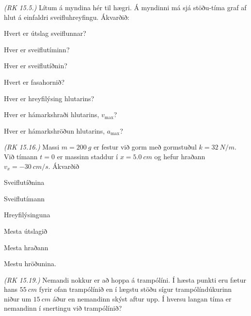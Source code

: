 \ifdefined \wholebook \else\documentclass[oneside]{book}\usepackage{EdlBook}\graphicspath{{figures/}}
\begin{document}
\begin{enumerate}[label = \textbf{Dæmi \thechapter.\arabic*.}]
\begin{minipage}{\linewidth}
\item \textit{(RK 15.5.)} Lítum á myndina hér til hægri. Á myndinni má sjá stöðu-tíma graf af hlut á einfaldri sveifluhreyfingu. Ákvarðið: \begin{enumerate*}[label = \textbf{(\alph*)}]
    \item Hvert er útslag sveiflunnar?
    \item Hver er sveiflutíminn?
    \item Hver er sveiflutíðnin?
    \item Hvert er fasahornið?
    \item Hver er hreyfilýsing hlutarins?
    \item Hver er hámarkshraði hlutarins, $v_{\text{max}}$?
    \item Hver er hámarkshröðun hlutarins, $a_{\text{max}}$?
\end{enumerate*}
\end{minipage}

\vspace{0.1cm}

\item \textit{(RK 15.16.)} Massi $m = \SI{200}{g}$ er festur við gorm með gormstuðul $k = \SI{32}{N/m}$. Við tímann $t = 0$ er massinn staddur í $x = \SI{5.0}{cm}$ og hefur hraðann $v_x = \SI{-30}{cm/s}$. Ákvarðið \begin{enumerate*}[label = \textbf{(\alph*)}]
    \item Sveiflutíðnina
    \item Sveiflutímann
    \item Hreyfilýsinguna
    \item Mesta útslagið
    \item Mesta hraðann
    \item Mestu hröðunina.
\end{enumerate*}

\item \textit{(RK 15.19.)} Nemandi nokkur er að hoppa á trampólíni. Í hæsta punkti eru fætur hans $\SI{55}{cm}$ fyrir ofan trampólínið en í lægstu stöðu sígur trampólíndúkurinn niður um $\SI{15}{cm}$ áður en nemandinn skýst aftur upp. Í hversu langan tíma er nemandinn í snertingu við trampólínið?

\end{enumerate}
\end{document}
